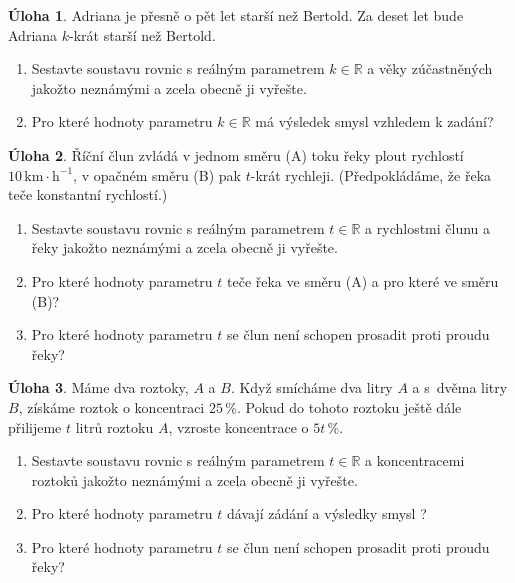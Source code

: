 \documentclass[12pt,a5paper]{extarticle}
\newcommand{\R}{\mathbb{R}}
\def\tisk{%
\newbox\shipouthackbox
\pdfpagewidth=2\pdfpagewidth
\let\oldshipout=\shipout
\def\shipout{\afterassignment\zdvojtmp \setbox\shipouthackbox=}%
\def\zdvojtmp{\aftergroup\zdvoj}%
\def\zdvoj{%
    \oldshipout\vbox{\hbox{%
        \copy\shipouthackbox
        \hskip\dimexpr .5\pdfpagewidth-\wd\shipouthackbox\relax
        \box\shipouthackbox
    }}%
}}%
\theoremstyle{definition}
\newtheorem{uloha}{Úloha}
\begin{document}

\begin{uloha}
Adriana je přesně o pět let starší než Bertold. Za deset let bude Adriana $k$-krát starší než Bertold.
\begin{enumerate}
    \item Sestavte soustavu rovnic s reálným parametrem $k \in \R$ a věky zúčastněných jakožto neznámými a zcela obecně ji vyřešte.
    \item Pro které hodnoty parametru $k \in \R$ má výsledek smysl vzhledem k zadání?
\end{enumerate}
\end{uloha}


\begin{uloha}
Říční člun zvládá v jednom směru (A) toku řeky plout rychlostí $10\,\mathrm{km}\cdot\mathrm{h}^{-1}$, v opačném směru (B) pak $t$-krát rychleji. (Předpokládáme, že řeka teče konstantní rychlostí.)
\begin{enumerate}
    \item Sestavte soustavu rovnic s reálným parametrem $t \in \R$ a rychlostmi člunu a řeky jakožto neznámými a zcela obecně ji vyřešte.
    \item Pro které hodnoty parametru $t$ teče řeka ve směru (A) a pro které ve směru (B)?
    \item Pro které hodnoty parametru $t$ se člun není schopen prosadit proti proudu řeky?
\end{enumerate}
\end{uloha}


\begin{uloha}
Máme dva roztoky, $A$ a $B$. Když smícháme dva litry $A$ a s~dvěma litry $B$, získáme roztok o koncentraci $25\,\%$. Pokud do tohoto roztoku ještě dále přilijeme $t$ litrů roztoku $A$, vzroste koncentrace o $5t\,\%$.
\begin{enumerate}
    \item Sestavte soustavu rovnic s reálným parametrem $t \in \R$ a koncentracemi roztoků jakožto neznámými a zcela obecně ji vyřešte.
    \item Pro které hodnoty parametru $t$ dávají zádání a výsledky smysl ?
    \item Pro které hodnoty parametru $t$ se člun není schopen prosadit proti proudu řeky?
\end{enumerate}
\end{uloha}
\end{document}
